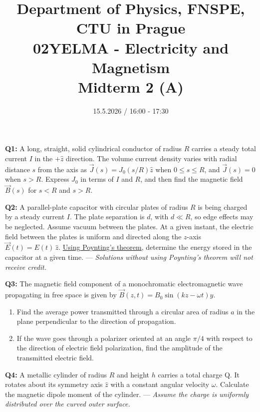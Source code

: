 \documentclass[a4paper,12pt]{article}
\title{{\large Department of Physics, FNSPE, CTU in Prague} \\
                  02YELMA - Electricity and Magnetism \\ 
          {\Large \textbf{Midterm 2 (A)}}\vspace{-1cm}}
\date{15.5.2026 / 16:00 - 17:30}
\author{}
\begin{document}
\maketitle

\textbf{Q1:} A long, straight, solid cylindrical conductor of radius $R$ carries a steady total current $I$ in the $+\hat z$ direction.  The volume current density varies with radial distance $s$ from the axis as $\vec{J}(s) = J_0(s/R)\hat{z}$ when $0 \le s \le R$, and $\vec{J}(s) = 0$ when $s > R$. Express $J_0$ in terms of $I$ and $R$, and then find the magnetic field \(\vec{B}(s)\) for $s < R$ and $s > R$. 

\vspace*{0.3cm}
\textbf{Q2:} A parallel-plate capacitor with circular plates of radius $R$ is being charged by a steady current $I$. The plate separation is $d$, with $d \ll R$, so edge effects may be neglected. Assume vacuum between the plates. At a given instant, the electric field between the plates is uniform and directed along the $z$-axis $\vec{E}(t)=E(t)\,\hat{z}$. \underline{Using Poynting’s theorem}, determine the energy stored in the capacitor at a given time. --- \textit{Solutions without using Poynting’s theorem will not receive credit.}

\vspace*{0.3cm}
\textbf{Q3:} The magnetic field component of a monochromatic electromagnetic wave propagating in free space is given by $\vec{B}(z,t) = B_0 \sin(kz - \omega t) \hat{y}$.
\begin{enumerate}

    \item[(a)] Find the average power transmitted through a circular area of radius \(a\) in the plane perpendicular to the direction of propagation.
    \item[(b)] If the wave goes through a polarizer oriented at an angle $\pi/4$ with respect to the direction of electric field polarization, find the amplitude of the transmitted electric field.
\end{enumerate}
\noindent

\vspace*{0.3cm}
\textbf{Q4:} A metallic cylinder of radius $R$ and height $h$ carries a total charge Q. It rotates about its symmetry axis $\hat{z}$ with a constant angular velocity $\omega$. Calculate the magnetic dipole moment of the cylinder. --- \textit{Assume the charge is uniformly distributed over the curved outer surface.}
\end{document}

